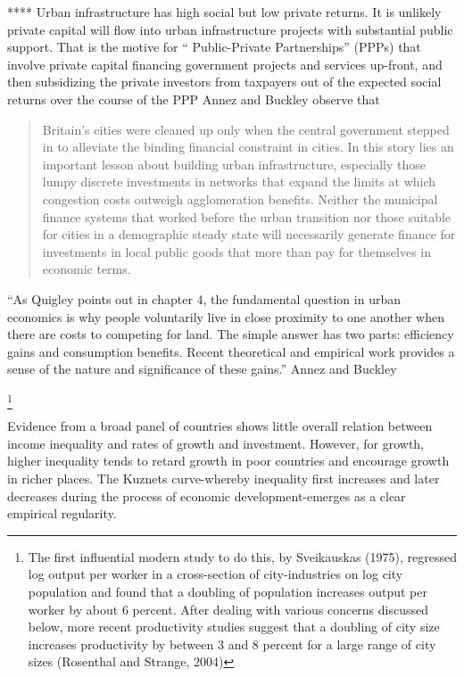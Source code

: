 \documentclass[a4paper]{article}
\theoremstyle{definition}
\theoremstyle{plain}
\begin{document}
{****  Urban infrastructure has high social but low private returns. It is unlikely private capital will flow into urban infrastructure projects with substantial public support. That is the motive for ``%
{Public-Private Partnerships}'' (PPPs) that involve private capital financing government projects and services up-front, and then subsidizing the private investors  from taxpayers out of the expected social returns over the course of the PPP
Annez and Buckley\cite{annezUrbanizationGrowthSetting2009} observe that 
\begin{quotation}
Britain's cities were cleaned up only when the central government stepped in to alleviate the binding financial constraint in cities. In this story lies an important lesson about building urban infrastructure, especially those lumpy discrete investments in networks that expand the limits at which congestion costs outweigh agglomeration benefits. Neither the municipal finance systems that worked before the urban transition nor those suitable for cities in a demographic steady state will necessarily generate finance for investments in local public goods that more than pay for themselves in economic terms. 
\end{quotation}




``As Quigley points out in chapter 4, the fundamental question in urban economics is why people voluntarily live in close proximity to one another when there are costs to competing for land. The simple answer has two parts: efficiency gains and consumption benefits. Recent theoretical and empirical work provides a sense of the nature and significance of these gains.'' Annez and Buckley\cite{annezUrbanizationGrowthSetting2009}%

\footnote{The first influential modern study to do this, by Sveikauskas (1975), regressed log output per worker in a cross-section of city-industries on log city population and found that a doubling of population increases output per worker by about 6 percent. After dealing with various concerns discussed below, more recent productivity studies suggest that a doubling of city size increases productivity by between 3 and 8 percent for a large range of city sizes (Rosenthal and Strange, 2004)\cite{pugaMagnitudeCausesAgglomeration2010}}

Evidence from a broad panel of countries shows little overall relation between income inequality and rates of growth and investment. However, for growth, higher inequality tends to retard growth in poor countries and encourage growth in richer places. The Kuznets curve-whereby inequality first increases and later decreases during the process of economic development-emerges as a clear empirical regularity.

}
\end{document}

